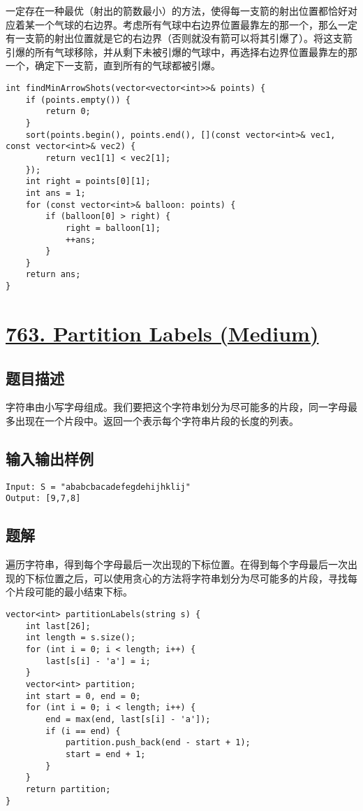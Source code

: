 \documentclass[lang=cn,10pt]{elegantbook}
\begin{document}
一定存在一种最优（射出的箭数最小）的方法，使得每一支箭的射出位置都恰好对应着某一个气球的右边界。考虑所有气球中右边界位置最靠左的那一个，那么一定有一支箭的射出位置就是它的右边界（否则就没有箭可以将其引爆了）。将这支箭引爆的所有气球移除，并从剩下未被引爆的气球中，再选择右边界位置最靠左的那一个，确定下一支箭，直到所有的气球都被引爆。

\begin{lstlisting}
int findMinArrowShots(vector<vector<int>>& points) {
	if (points.empty()) {
		return 0;
	}
	sort(points.begin(), points.end(), [](const vector<int>& vec1, const vector<int>& vec2) {
		return vec1[1] < vec2[1];
	});
	int right = points[0][1];
	int ans = 1;
	for (const vector<int>& balloon: points) {
		if (balloon[0] > right) {
			right = balloon[1];
			++ans;
		}
	}
	return ans;
}
\end{lstlisting}

{\color{red}\section{\href{https://leetcode.cn/problems/partition-labels/}{763. Partition Labels (Medium)}}} \label{Ch2.763}

\subsection*{题目描述}

字符串由小写字母组成。我们要把这个字符串划分为尽可能多的片段，同一字母最多出现在一个片段中。返回一个表示每个字符串片段的长度的列表。

\subsection*{输入输出样例}

\begin{lstlisting}
Input: S = "ababcbacadefegdehijhklij"
Output: [9,7,8]
\end{lstlisting}

\subsection*{题解}

遍历字符串，得到每个字母最后一次出现的下标位置。在得到每个字母最后一次出现的下标位置之后，可以使用贪心的方法将字符串划分为尽可能多的片段，寻找每个片段可能的最小结束下标。

\begin{lstlisting}
vector<int> partitionLabels(string s) {
	int last[26];
	int length = s.size();
	for (int i = 0; i < length; i++) {
		last[s[i] - 'a'] = i;
	}
	vector<int> partition;
	int start = 0, end = 0;
	for (int i = 0; i < length; i++) {
		end = max(end, last[s[i] - 'a']);
		if (i == end) {
			partition.push_back(end - start + 1);
			start = end + 1;
		}
	}
	return partition;
}
\end{lstlisting}
\end{document}
